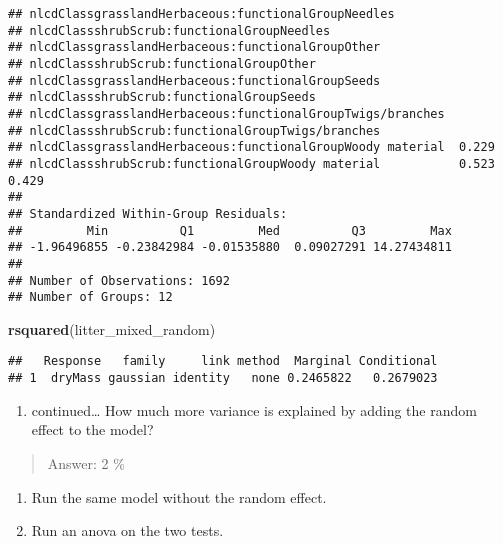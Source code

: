 \documentclass[]{article}
\newenvironment{Shaded}{\begin{snugshade}}{\end{snugshade}}
\newcommand{\KeywordTok}[1]{\textcolor[rgb]{0.13,0.29,0.53}{\textbf{#1}}}
\newcommand{\NormalTok}[1]{#1}
\providecommand{\tightlist}{%
  \setlength{\itemsep}{0pt}\setlength{\parskip}{0pt}}
\begin{document}
\begin{verbatim}
## nlcdClassgrasslandHerbaceous:functionalGroupNeedles                     
## nlcdClassshrubScrub:functionalGroupNeedles                              
## nlcdClassgrasslandHerbaceous:functionalGroupOther                       
## nlcdClassshrubScrub:functionalGroupOther                                
## nlcdClassgrasslandHerbaceous:functionalGroupSeeds                       
## nlcdClassshrubScrub:functionalGroupSeeds                                
## nlcdClassgrasslandHerbaceous:functionalGroupTwigs/branches              
## nlcdClassshrubScrub:functionalGroupTwigs/branches                       
## nlcdClassgrasslandHerbaceous:functionalGroupWoody material  0.229       
## nlcdClassshrubScrub:functionalGroupWoody material           0.523  0.429
## 
## Standardized Within-Group Residuals:
##         Min          Q1         Med          Q3         Max 
## -1.96496855 -0.23842984 -0.01535880  0.09027291 14.27434811 
## 
## Number of Observations: 1692
## Number of Groups: 12
\end{verbatim}

\begin{Shaded}
\begin{Highlighting}[]
\KeywordTok{rsquared}\NormalTok{(litter_mixed_random)}
\end{Highlighting}
\end{Shaded}

\begin{verbatim}
##   Response   family     link method  Marginal Conditional
## 1  dryMass gaussian identity   none 0.2465822   0.2679023
\end{verbatim}

\begin{enumerate}
\def\labelenumi{\alph{enumi}.}
\setcounter{enumi}{1}
\tightlist
\item
  continued\ldots{} How much more variance is explained by adding the
  random effect to the model?
\end{enumerate}

\begin{quote}
Answer: 2 \%
\end{quote}

\begin{enumerate}
\def\labelenumi{\alph{enumi}.}
\setcounter{enumi}{2}
\tightlist
\item
  Run the same model without the random effect.
\item
  Run an anova on the two tests.
\end{enumerate}
\end{document}
